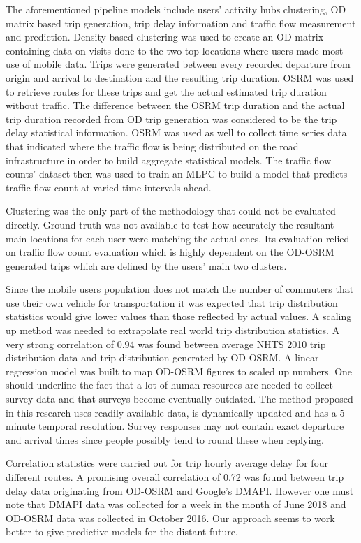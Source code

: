 \documentclass[12pt, a4paper]{report}
\theoremstyle{definition}
\theoremstyle{definition}%
\theoremstyle{definition}%
\theoremstyle{definition}%
\theoremstyle{definition}%
\theoremstyle{definition}%
\begin{document}
The aforementioned pipeline models include users' activity hubs clustering, OD matrix based trip generation, trip delay information and traffic flow measurement and prediction. Density based clustering was used to create an OD matrix containing data on visits done to the two top locations where users made most use of mobile data. Trips were generated between every recorded departure from origin and arrival to destination and the resulting trip duration. OSRM was used to retrieve routes for these trips and get the actual estimated trip duration without traffic. The difference between the OSRM trip duration and the actual trip duration recorded from OD trip generation was considered to be the trip delay statistical information. OSRM was used as well to collect time series data that indicated where the traffic flow is being distributed on the road infrastructure in order to build aggregate statistical models. The traffic flow counts' dataset then was used to train an MLPC to build a model that predicts traffic flow count at varied time intervals ahead.

Clustering was the only part of the methodology that could not be evaluated directly. Ground truth was not available to test how  accurately the resultant main locations for each user were matching the actual ones. Its evaluation relied on traffic flow count evaluation which is highly dependent on the OD-OSRM generated trips which are defined by the users' main two clusters.

Since the mobile users population does not match the number of commuters that use their own vehicle for transportation it was expected that trip distribution statistics would give lower values than those reflected by actual values. A scaling up method was needed to extrapolate real world trip distribution statistics. A very strong correlation of 0.94 was found between average NHTS 2010 trip distribution data and trip distribution generated by OD-OSRM. A linear regression model was built to map OD-OSRM figures to scaled up numbers. One should underline the fact that a lot of human resources are needed to collect survey data and that surveys become eventually outdated. The method proposed in this research uses readily available data, is dynamically updated and has a 5 minute temporal resolution. Survey responses may not contain exact departure and arrival times since people possibly tend to round these when replying.

Correlation statistics were carried out for trip hourly average delay for four different routes. A promising overall correlation of 0.72 was found between trip delay data originating from OD-OSRM and Google's DMAPI. However one must note that DMAPI data was collected for a week in the month of June 2018 and OD-OSRM data was collected in October 2016. Our approach seems to work better to give predictive models for the distant future.
\end{document}
